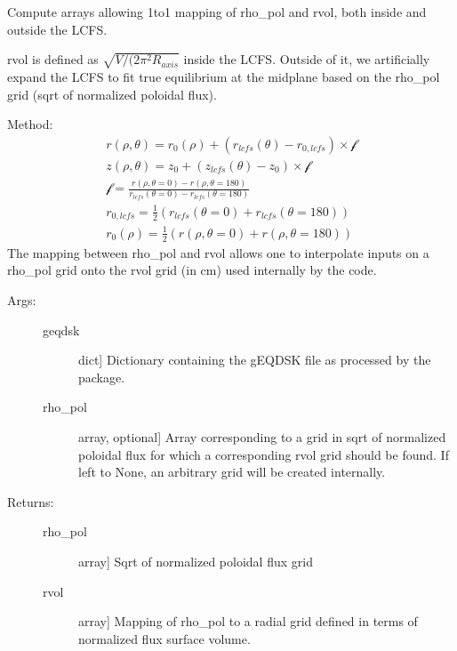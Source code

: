 \documentclass[letterpaper,10pt,english]{sphinxmanual}
\begin{document}
\begin{fulllineitems}
\label{\detokenize{aurora:aurora.grids_utils.get_rhopol_rvol_mapping}}
Compute arrays allowing 1\sphinxhyphen{}to\sphinxhyphen{}1 mapping of rho\_pol and rvol, both inside and
outside the LCFS.

rvol is defined as \(\sqrt{V/(2 \pi^2 R_{axis}}\) inside the LCFS. Outside of it,
we artificially expand the LCFS to fit true equilibrium at the midplane based
on the rho\_pol grid (sqrt of normalized poloidal flux).

Method:
\begin{equation*}
\begin{split}r(\rho,\theta) = r_0(\rho) +  (r_{lcfs}(\theta) - r_{0,lcfs}) \times \mathcal{f} \\
z(\rho,\theta) = z_0      +  (z_{lcfs}(\theta) - z_0     ) \times \mathcal{f} \\
\mathcal{f} = \frac{ r(\rho,\theta=0) - r(\rho,\theta=180)}{r_{lcfs}(\theta=0)- r_{lcfs}(\theta=180)} \\
r_{0,lcfs} = \frac{1}{2} (r_{lcfs}(\theta=0)+ r_{lcfs}(\theta=180)) \\
r_0(\rho) = \frac{1}{2} (r(\rho,\theta=0) + r(\rho,\theta=180))\end{split}
\end{equation*}
The mapping between rho\_pol and rvol allows one to interpolate inputs on a
rho\_pol grid onto the rvol grid (in cm) used internally by the code.
\begin{description}
\item[{Args:}] \leavevmode\begin{description}
\item[{geqdsk}] \leavevmode{[}dict{]}
Dictionary containing the g\sphinxhyphen{}EQDSK file as processed by the 
package.

\item[{rho\_pol}] \leavevmode{[}array, optional{]}
Array corresponding to a grid in sqrt of normalized poloidal flux for which a 
corresponding rvol grid should be found. If left to None, an arbitrary grid will be 
created internally.

\end{description}

\item[{Returns:}] \leavevmode\begin{description}
\item[{rho\_pol}] \leavevmode{[}array{]}
Sqrt of normalized poloidal flux grid

\item[{rvol}] \leavevmode{[}array{]}
Mapping of rho\_pol to a radial grid defined in terms of normalized flux surface volume.

\end{description}

\end{description}

\end{fulllineitems}
\end{document}
